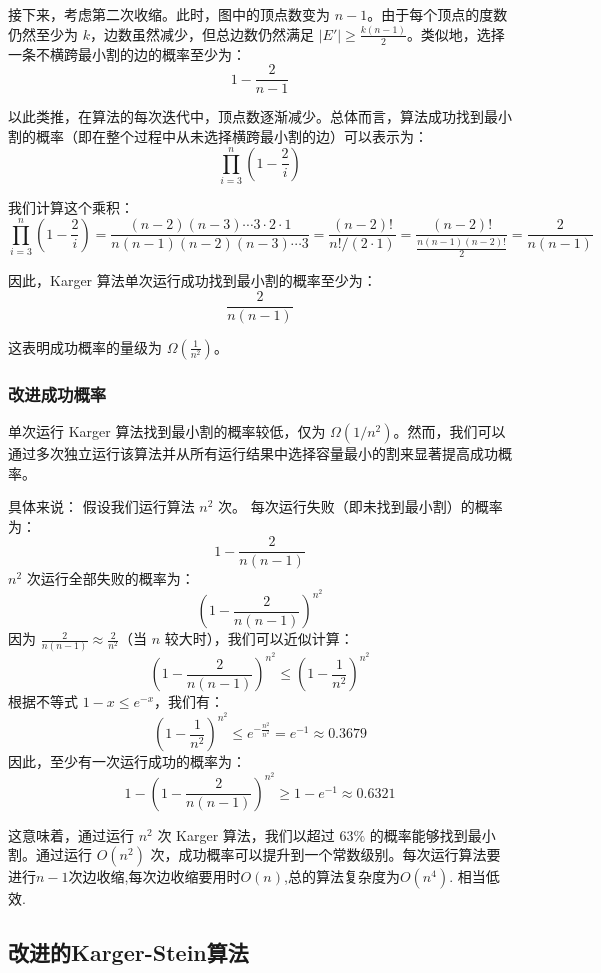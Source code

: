 \documentclass[lang=cn,newtx,10pt,scheme=chinese,chinesefont=nofont,citestyle=gb7714-2015, bibstyle=gb7714-2015]{elegantbook}
\begin{document}
\begin{refsection}
接下来，考虑第二次收缩。此时，图中的顶点数变为 \( n-1 \)。由于每个顶点的度数仍然至少为 \( k \)，边数虽然减少，但总边数仍然满足 \( |E'| \geq \frac{k (n-1)}{2} \)。类似地，选择一条不横跨最小割的边的概率至少为：
\[
1 - \frac{2}{n-1}
\]

以此类推，在算法的每次迭代中，顶点数逐渐减少。总体而言，算法成功找到最小割的概率（即在整个过程中从未选择横跨最小割的边）可以表示为：
\[
\prod_{i=3}^{n} \left(1 - \frac{2}{i}\right)
\]

我们计算这个乘积：
\[
\prod_{i=3}^{n} \left(1 - \frac{2}{i}\right) = \frac{(n-2)(n-3) \cdots 3 \cdot 2 \cdot 1}{n (n-1) (n-2) (n-3) \cdots 3} = \frac{(n-2)!}{n! / (2 \cdot 1)} = \frac{(n-2)!}{\frac{n (n-1) (n-2)!}{2}} = \frac{2}{n (n-1)}
\]

因此，Karger 算法单次运行成功找到最小割的概率至少为：
\[
\frac{2}{n (n-1)}
\]

这表明成功概率的量级为 \( \Omega\left(\frac{1}{n^2}\right) \)。

\subsubsection{改进成功概率}

单次运行 Karger 算法找到最小割的概率较低，仅为 \( \Omega(1/n^2) \)。然而，我们可以通过多次独立运行该算法并从所有运行结果中选择容量最小的割来显著提高成功概率。

具体来说： 假设我们运行算法 \( n^2 \) 次。
 每次运行失败（即未找到最小割）的概率为：
    \[
    1 - \frac{2}{n (n-1)}
    \]
 \( n^2 \) 次运行全部失败的概率为：
    \[
    \left(1 - \frac{2}{n (n-1)}\right)^{n^2}
    \]
 因为 \( \frac{2}{n (n-1)} \approx \frac{2}{n^2} \)（当 \( n \) 较大时），我们可以近似计算：
    \[
    \left(1 - \frac{2}{n (n-1)}\right)^{n^2} \leq \left(1 - \frac{1}{n^2}\right)^{n^2}
    \]
 根据不等式 \( 1 - x \leq e^{-x} \)，我们有：
    \[
    \left(1 - \frac{1}{n^2}\right)^{n^2} \leq e^{-\frac{n^2}{n^2}} = e^{-1} \approx 0.3679
    \]
   因此，至少有一次运行成功的概率为：
    \[
    1 - \left(1 - \frac{2}{n (n-1)}\right)^{n^2} \geq 1 - e^{-1} \approx 0.6321
    \]


这意味着，通过运行 \( n^2 \) 次 Karger 算法，我们以超过 \( 63\% \) 的概率能够找到最小割。通过运行 \( O(n^2) \) 次，成功概率可以提升到一个常数级别。每次运行算法要进行$n-1$次边收缩,每次边收缩要用时$O(n)$,总的算法复杂度为$O(n^4)$. 相当低效.

\subsection{改进的Karger-Stein算法}


\end{refsection}
\end{document}
